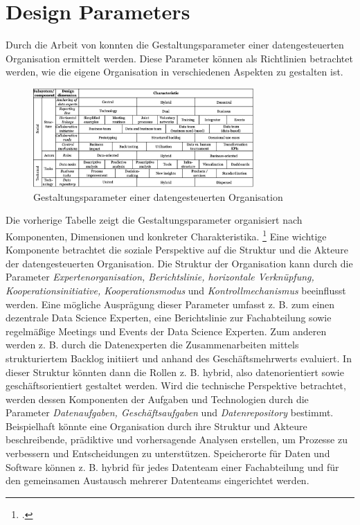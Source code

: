 \section{Design Parameters}

Durch die Arbeit von  konnten die Gestaltungsparameter einer datengesteuerten Organisation ermittelt werden.
Diese Parameter können als Richtlinien betrachtet werden, wie die eigene Organisation in verschiedenen Aspekten zu gestalten ist.

\begin{figure}[htb]
    \centering
    \includegraphics[width=0.75\textwidth]{graphics/DDO_design.png}
    \caption{Gestaltungsparameter einer datengesteuerten Organisation}
    \label{fig:DDOs design}
\end{figure}

Die vorherige Tabelle zeigt die Gestaltungsparameter organisiert nach Komponenten, Dimensionen und konkreter Charakteristika. \footcite[Vgl.][S. 5]{JanineAdinaHagen.2020}
Eine wichtige Komponente betrachtet die soziale Perspektive auf die Struktur und die Akteure der datengesteuerten Organisation.
Die Struktur der Organisation kann durch die Parameter \textit{Expertenorganisation, Berichtslinie, horizontale Verknüpfung, Kooperationsinitiative, Kooperationsmodus} und \textit{Kontrollmechanismus} beeinflusst werden.
Eine mögliche Ausprägung dieser Parameter umfasst z. B. zum einen dezentrale Data Science Experten, eine Berichtslinie zur Fachabteilung sowie regelmäßige Meetings und Events der Data Science Experten.
Zum anderen werden z. B. durch die Datenexperten die Zusammenarbeiten mittels strukturiertem Backlog initiiert und anhand des Geschäftsmehrwerts evaluiert.
In dieser Struktur könnten dann die Rollen z. B. hybrid, also datenorientiert sowie geschäftsorientiert gestaltet werden.
Wird die technische Perspektive betrachtet, werden dessen Komponenten der Aufgaben und Technologien durch die Parameter \textit{Datenaufgaben, Geschäftsaufgaben} und \textit{Datenrepository} bestimmt.
Beispielhaft könnte eine Organisation durch ihre Struktur und Akteure beschreibende, prädiktive und vorhersagende Analysen erstellen, um Prozesse zu verbessern und Entscheidungen zu unterstützen.
Speicherorte für Daten und Software können z. B. hybrid für jedes Datenteam einer Fachabteilung und für den gemeinsamen Austausch mehrerer Datenteams eingerichtet werden.

